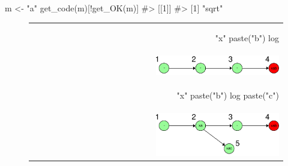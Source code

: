 \begin{example}
m <- "a" %
get_code(m)[!get_OK(m)]
#> [[1]]
#> [1] "sqrt"
\end{example}

\begin{figure}[!htbp]
  \centering
  \begin{tabular}{| r |}
    \hline
    \begin{minipage}{0.95\textwidth}
\vspace{1mm}
\begin{example}
"x" %
         paste("b") %
         log %
\end{example}
    \end{minipage}
    \\
    \begin{minipage}{0.95\textwidth}
    \centering
    \includegraphics[width=0.5\textwidth]{Images/rmonad_unbranch}
    \end{minipage}
    \\
    \hline
    \begin{minipage}{0.95\textwidth}
\vspace{1mm}
\begin{example}
"x" %
         paste("b") %
         log %
         paste("c") %
\end{example}
    \end{minipage}
    \\
    \begin{minipage}{0.95\textwidth}
    \centering
    \includegraphics[width=0.5\textwidth]{Images/rmonad_branch}
    \end{minipage}
    \\
    \hline
  \end{tabular}

\end{figure}
